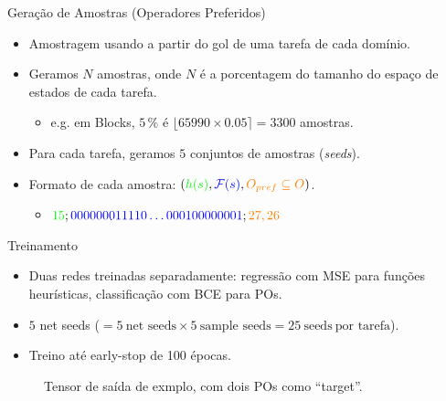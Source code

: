 \documentclass{beamer}
\begin{document}
\begin{frame}{Geração de Amostras (Operadores Preferidos)}
\begin{itemize}
  \item Amostragem usando \alert{\bfsrs} a partir do gol de uma tarefa de cada domínio.
  \pause
  \item Geramos $N$ amostras, onde $N$ é a porcentagem do tamanho do espaço de estados de cada tarefa.
    \begin{itemize}
      \item e.g. em Blocks, $5\,\%$ é $\lfloor 65990 \times 0.05 \rceil = 3300$ amostras.
    \end{itemize}
  \pause
  \item Para cada tarefa, geramos \alert{$5$} conjuntos de amostras (\emph{seeds}).
  \pause
  \item Formato de cada amostra: $({\color{green} h(s)}, {\color{blue} \mathcal{F}(s)}, {\color{orange} O_{pref} \subseteq O})$.
    \begin{itemize}
      \item ${\color{green} 15};{\color{blue} 000000011110\ldots000100000001};{\color{orange} 27,26}$
    \end{itemize}
\end{itemize}
\end{frame}

\begin{frame}{Treinamento}
\begin{itemize}
  \item Duas redes treinadas separadamente: \alert{regressão} com MSE para funções heurísticas, \alert{classificação} com BCE para POs.
  \pause
  \item $5$ net seeds ($= 5~\text{net seeds} \times 5~\text{sample seeds} = 25~\text{seeds}~\text{por tarefa}$).
  \pause
  \item Treino até \alert{early-stop} de 100 épocas. %
\end{itemize}

\pause
\begin{figure}[tb]
\caption[]{Tensor de saída de exmplo, com dois POs como ``target''.}
\centering
{}
\label{fig:po-tensor}
\end{figure}

\end{frame}
\end{document}
